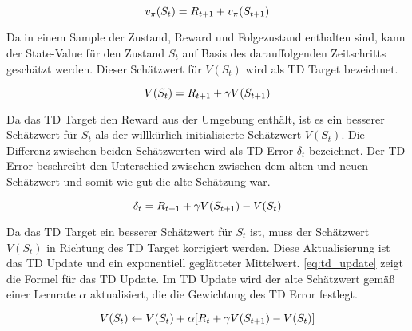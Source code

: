 \begin{equation}
    \equationentry{Beziehung zwischen State-Value Funktionen}
    v_{\pi}(S_t)= R_{t+1}+v_\pi(S_{t+1})
\end{equation}

Da in einem Sample der Zustand, Reward und Folgezustand enthalten sind, kann der State-Value für den Zustand $S_t$ auf Basis des darauffolgenden Zeitschritts geschätzt werden. 
Dieser Schätzwert für $V(S_t)$ wird als \ac{TD} Target bezeichnet. \cite[S. 120f.]{suttonReinforcementLearningIntroduction2018}

\begin{equation}
    \label{eq:td_target}
    \equationentry{Temporal-Difference Target}
    V(S_t)= R_{t+1}+\gamma V(S_{t+1})
\end{equation}

Da das \ac{TD} Target den Reward aus der Umgebung enthält, ist es ein besserer Schätzwert für $S_t$ als der willkürlich initialisierte Schätzwert $V(S_t)$. 
Die Differenz zwischen beiden Schätzwerten wird als \ac{TD} Error $\delta_t$ bezeichnet. 
Der \ac{TD} Error beschreibt den Unterschied zwischen zwischen dem alten und neuen Schätzwert und somit wie gut die alte Schätzung war. \cite[S. 120f.]{suttonReinforcementLearningIntroduction2018}

\begin{equation}
    \label{eq:td_error}
    \equationentry{Temporal-Difference Error}
    \delta_t = R_{t+1} + \gamma V(S_{t+1}) - V(S_t)
\end{equation}

Da das \ac{TD} Target ein besserer Schätzwert für $S_t$ ist, muss der Schätzwert $V(S_t)$ in Richtung des \ac{TD} Target korrigiert werden. 
Diese Aktualisierung ist das \ac{TD} Update und ein exponentiell geglätteter Mittelwert. \cite[S. 33]{suttonReinforcementLearningIntroduction2018}
\cref{eq:td_update} zeigt die Formel für das \ac{TD} Update. 
Im \ac{TD} Update wird der alte Schätzwert gemäß einer Lernrate $\alpha$ aktualisiert, die die Gewichtung des \ac{TD} Error festlegt. \cite[S. 120]{suttonReinforcementLearningIntroduction2018}

\begin{equation}
    \label{eq:td_update}
    \equationentry{Temporal-Difference Update}
    V(S_t) \leftarrow V(S_t) + \alpha [R_t+\gamma V(S_{t+1}) -V(S_t)]
\end{equation}


